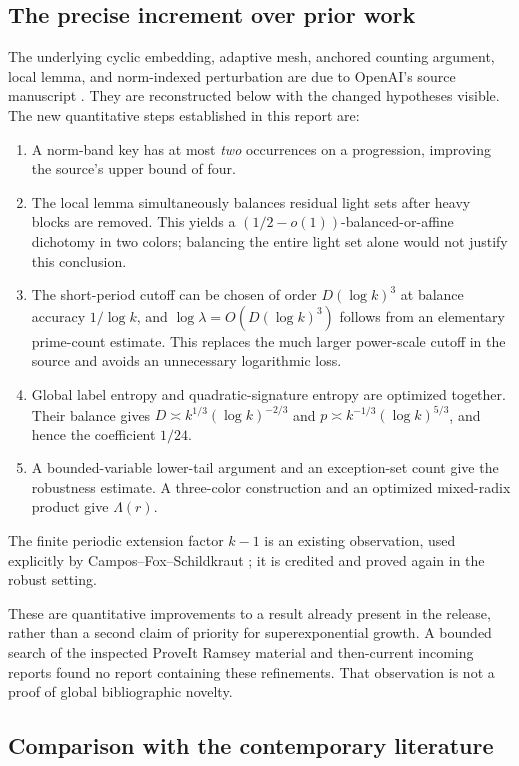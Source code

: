 \subsection{The precise increment over prior work}

The underlying cyclic embedding, adaptive mesh, anchored counting
argument, local lemma, and norm-indexed perturbation are due to
OpenAI's source manuscript \cite{openai160}.
They are reconstructed below with the changed hypotheses visible.
The new quantitative steps established in this report are:
\begin{enumerate}
 \item A norm-band key has at most \emph{two} occurrences on a
 progression, improving the source's upper bound of four.
 \item The local lemma simultaneously balances residual light sets
 after heavy blocks are removed. This yields a
 \((1/2-o(1))\)-balanced-or-affine dichotomy in two colors; balancing
 the entire light set alone would not justify this conclusion.
 \item The short-period cutoff can be chosen of order
 \(D(\log k)^3\) at balance accuracy \(1/\log k\), and
 \(\log\lambda=O(D(\log k)^3)\) follows from an elementary prime-count
 estimate. This replaces the much larger power-scale cutoff in
 the source and avoids an unnecessary logarithmic loss.
 \item Global label entropy and quadratic-signature entropy are
 optimized together. Their balance gives
 \(D\asymp k^{1/3}(\log k)^{-2/3}\) and
 \(p\asymp k^{-1/3}(\log k)^{5/3}\), and hence the coefficient \(1/24\).
 \item A bounded-variable lower-tail argument and an exception-set
 count give the robustness estimate. A three-color construction and
 an optimized mixed-radix product give \(\Lambda(r)\).
\end{enumerate}
The finite periodic extension factor \(k-1\) is an existing observation,
used explicitly by Campos--Fox--Schildkraut
\cite[Lemma 2]{camposFoxSchildkraut2026}; it is credited and proved
again in the robust setting.

These are quantitative improvements to a result already present in
the release, rather than a second claim of priority for
superexponential growth. A bounded search of the inspected ProveIt
Ramsey material and then-current incoming reports found no report
containing these refinements. That observation is not a proof of
global bibliographic novelty.

\subsection{Comparison with the contemporary literature}

